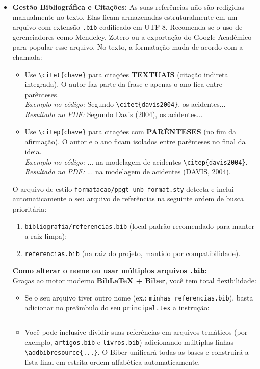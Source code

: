 \documentclass[a4paper,12pt]{article}
\begin{document}
\begin{itemize}
    \item \textbf{Gestão Bibliográfica e Citações:} As suas referências não são redigidas manualmente no texto. Elas ficam armazenadas estruturalmente em um arquivo com extensão \texttt{.bib} codificado em UTF-8. Recomenda-se o uso de gerenciadores como Mendeley, Zotero ou a exportação do Google Acadêmico para popular esse arquivo. No texto, a formatação muda de acordo com a chamada:
    \begin{itemize}
        \item Use \texttt{\textbackslash citet\{chave\}} para citações \textbf{TEXTUAIS} (citação indireta integrada). O autor faz parte da frase e apenas o ano fica entre parênteses.\\ \textit{Exemplo no código:} Segundo \texttt{\textbackslash citet\{davis2004\}}, os acidentes...\\ \textit{Resultado no PDF:} Segundo Davis (2004), os acidentes...
        \item Use \texttt{\textbackslash citep\{chave\}} para citações com \textbf{PARÊNTESES} (no fim da afirmação). O autor e o ano ficam isolados entre parênteses no final da ideia.\\ \textit{Exemplo no código:} ... na modelagem de acidentes \texttt{\textbackslash citep\{davis2004\}}.\\ \textit{Resultado no PDF:} ... na modelagem de acidentes (DAVIS, 2004).
    \end{itemize}
    
    \begin{atencao}
    O arquivo de estilo \texttt{formatacao/ppgt-unb-format.sty} detecta e inclui automaticamente o seu arquivo de referências na seguinte ordem de busca prioritária:
    \begin{enumerate}
        \item \texttt{bibliografia/referencias.bib} (local padrão recomendado para manter a raiz limpa);
        \item \texttt{referencias.bib} (na raiz do projeto, mantido por compatibilidade).
    \end{enumerate}

    \textbf{Como alterar o nome ou usar múltiplos arquivos \texttt{.bib}:}\\
    Graças ao motor moderno \textbf{BibLaTeX + Biber}, você tem total flexibilidade:
    \begin{itemize}
        \item Se o seu arquivo tiver outro nome (ex.: \texttt{minhas\_referencias.bib}), basta adicionar no preâmbulo do seu \texttt{principal.tex} a instrução:
\begin{verbatim}

\end{verbatim}
        \item Você pode inclusive dividir suas referências em arquivos temáticos (por exemplo, \texttt{artigos.bib} e \texttt{livros.bib}) adicionando múltiplas linhas \texttt{\textbackslash addbibresource\{...\}}. O Biber unificará todas as bases e construirá a lista final em estrita ordem alfabética automaticamente.
    \end{itemize}


\end{atencao}
\end{itemize}
\end{document}
